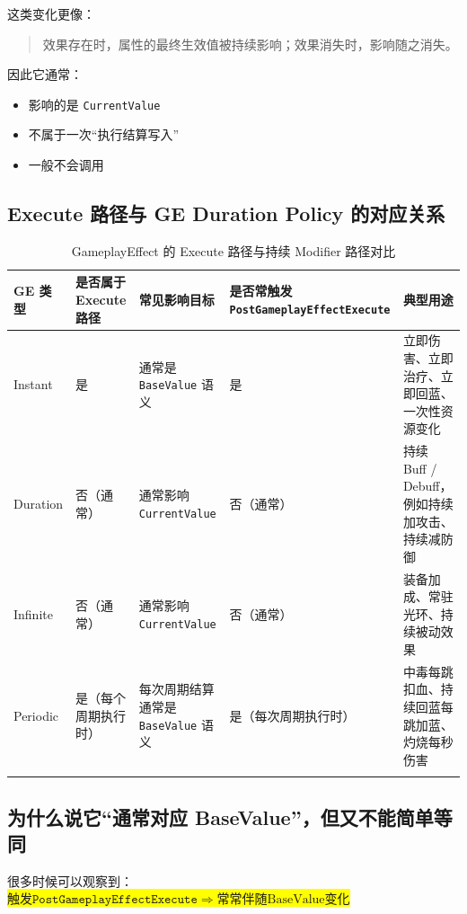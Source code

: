 \documentclass[10pt,CJKmath]{ctexart}
\begin{document}
这类变化更像：

\begin{quote}
	效果存在时，属性的最终生效值被持续影响；效果消失时，影响随之消失。
\end{quote}

因此它通常：

\begin{itemize}
	\item 影响的是 \verb|CurrentValue|
	\item 不属于一次“执行结算写入”
	\item 一般不会调用 
\end{itemize}

\subsection{Execute 路径与 GE Duration Policy 的对应关系}

\begin{center}
	\begin{longtable}{|p{}|p{}|p{}|p{}|p{}|}
		\hline
		\textbf{GE 类型} & \textbf{是否属于 Execute 路径} & \textbf{常见影响目标} & \textbf{是否常触发 \texttt{PostGameplayEffectExecute}} & \textbf{典型用途} \\
		\hline
		Instant & 是 & 通常是 \verb|BaseValue| 语义 & 是 & 立即伤害、立即治疗、立即回蓝、一次性资源变化 \\
		\hline
		Duration & 否（通常） & 通常影响 \verb|CurrentValue| & 否（通常） & 持续 Buff / Debuff，例如持续加攻击、持续减防御 \\
		\hline
		Infinite & 否（通常） & 通常影响 \verb|CurrentValue| & 否（通常） & 装备加成、常驻光环、持续被动效果 \\
		\hline
		Periodic & 是（每个周期执行时） & 每次周期结算通常是 \verb|BaseValue| 语义 & 是（每次周期执行时） & 中毒每跳扣血、持续回蓝每跳加蓝、灼烧每秒伤害 \\
		\hline\caption{GameplayEffect 的 Execute 路径与持续 Modifier 路径对比}
	\end{longtable}
	
\end{center}

\subsection{为什么说它“通常对应 BaseValue”，但又不能简单等同}

很多时候可以观察到：\colorbox{yellow}{
	$触发  \texttt{PostGameplayEffectExecute} \Rightarrow 常常伴随 \text{BaseValue} 变化$}
\end{document}
